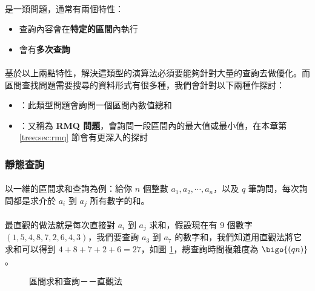 \documentclass[12pt,a4paper,oneside]{report}
\begin{document}
\begin{CJK}{UTF8}{bkai}
\paragraph{} 是一類問題，通常有兩個特性：
\begin{itemize}
\item 查詢內容會在\textbf{特定的區間}內執行
\item 會有\textbf{多次查詢}
\end{itemize}
\paragraph{}基於以上兩點特性，解決這類型的演算法必須要能夠針對大量的查詢去做優化。而區間查找問題需要搜尋的資料形式有很多種，我們會針對以下兩種作探討：
\begin{itemize}
\item {}：此類型問題會詢問一個區間內數值總和
\item {}：又稱為 \textbf{RMQ 問題}，會詢問一段區間內的最大值或最小值，在本章第 \ref{tree:sec:rmq} 節會有更深入的探討
\end{itemize}

\subsubsection{靜態查詢}

\paragraph{}以一維的區間求和查詢為例：給你 $n$ 個整數 $a_1,a_2,\cdots{},a_n$，以及 $q$ 筆詢問，每次詢問都是求介於 $a_i$ 到 $a_j$ 所有數字的和。

\paragraph{}最直觀的做法就是每次直接對 $a_i$ 到 $a_j$ 求和，假設現在有 9 個數字 $(1,5,4,8,7,2,6,4,3)$，我們要查詢 $a_3$ 到 $a_7$ 的數字和，我們知道用直觀法將它求和可以得到 $4+8+7+2+6=27$，如圖 \ref{tree:fig:rsq:naive}，總查詢時間複雜度為 $\bigo{(qn)}$。

\begin{figure}[h]
\centering
{}
\caption{區間求和查詢－－直觀法}
\label{tree:fig:rsq:naive}
\end{figure}


\end{CJK}
\end{document}
